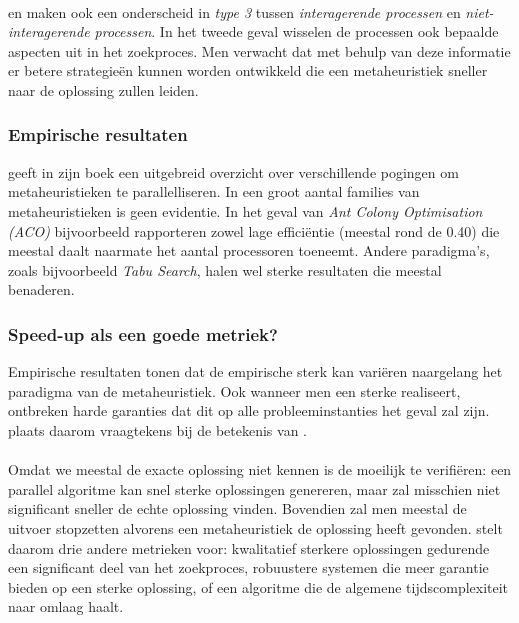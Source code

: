 \paragraph{}
 en  maken ook een onderscheid in \emph{type 3} tussen \emph{interagerende processen} en \emph{niet-interagerende processen}. In het tweede geval wisselen de processen ook bepaalde aspecten uit in het zoekproces. Men verwacht dat met behulp van deze informatie er betere strategie\"en kunnen worden ontwikkeld die een metaheuristiek sneller naar de oplossing zullen leiden.

\subsubsection{Empirische resultaten}

 geeft in zijn boek een uitgebreid overzicht over verschillende pogingen om metaheuristieken te parallelliseren. In een groot aantal families van metaheuristieken is \ablsu{} geen evidentie. In het geval van \emph{Ant Colony Optimisation (ACO)} bijvoorbeeld rapporteren zowel \cite{Souto2004,Randall2002,Delisle2001,Catalano:2001:PRH:761889.761897} lage effici\"entie (meestal rond de 0.40) die meestal daalt naarmate het aantal processoren toeneemt. Andere paradigma's, zoals bijvoorbeeld \emph{Tabu Search}, halen wel sterke resultaten die meestal \ablsu{} benaderen.

\subsubsection{Speed-up als een goede metriek?}
Empirische resultaten tonen dat de empirische \absu{} sterk kan vari\"eren naargelang het paradigma van de metaheuristiek. Ook wanneer men een sterke \absu{} realiseert, ontbreken harde garanties dat dit op alle probleeminstanties het geval zal zijn. \cite{crainicAndToulouse} plaats daarom vraagtekens bij de betekenis van \absu{}.

\paragraph{}
Omdat we meestal de exacte oplossing niet kennen is de \absu{} moeilijk te verifi\"eren: een parallel algoritme kan snel sterke oplossingen genereren, maar zal misschien niet significant sneller de echte oplossing vinden. Bovendien zal men meestal de uitvoer stopzetten alvorens een metaheuristiek de oplossing heeft gevonden. \cite{crainicAndToulouse} stelt daarom drie andere metrieken voor: kwalitatief sterkere oplossingen gedurende een significant deel van het zoekproces, robuustere systemen die meer garantie bieden op een sterke oplossing, of een algoritme die de algemene tijdscomplexiteit naar omlaag haalt.

